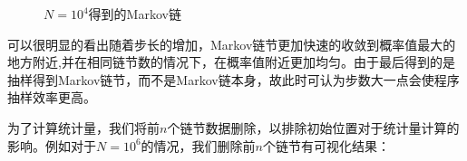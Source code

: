 \documentclass[a4paper,11pt]{article}
\begin{document}
\begin{figure}[!htbp]   
\centering     
{}
\caption{$ N = 10^{4} $得到的Markov链}      
\end{figure}

\newpage
可以很明显的看出随着步长的增加，Markov链节更加快速的收敛到概率值最大的地方附近,并在相同链节数的情况下，在概率值附近更加均匀。由于最后得到的是抽样得到Markov链节，而不是Markov链本身，故此时可认为步数大一点会使程序抽样效率更高。

为了计算统计量，我们将前$n$个链节数据删除，以排除初始位置对于统计量计算的影响。例如对于$N=10^{6}$的情况，我们删除前$n$个链节有可视化结果：
\end{document}
